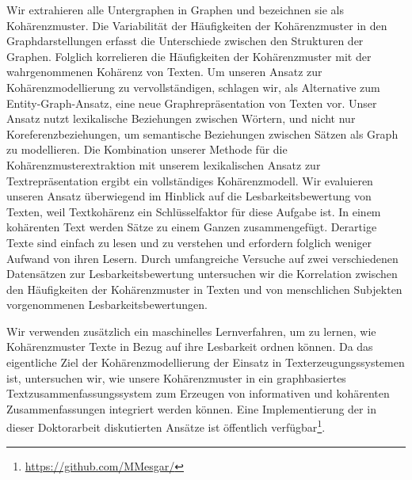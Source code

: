 Wir extrahieren alle Untergraphen in Graphen und bezeichnen sie als Kohärenzmuster. 
Die Variabilität der Häufigkeiten der Kohärenzmuster in den Graphdarstellungen erfasst die Unterschiede zwischen den Strukturen der Graphen. 
Folglich korrelieren die Häufigkeiten der Kohärenzmuster mit der wahrgenommenen Kohärenz von Texten. 
Um unseren Ansatz zur Kohärenzmodellierung zu vervollständigen, schlagen wir, als Alternative zum \mbox{Entity-Graph-Ansatz}, eine neue Graphrepräsentation von Texten vor. 
Unser Ansatz nutzt lexikalische Beziehungen zwischen Wörtern, und nicht nur Koreferenzbeziehungen, um semantische Beziehungen zwischen Sätzen als Graph zu modellieren. 
Die Kombination unserer Methode für die Kohärenzmusterextraktion mit unserem lexikalischen Ansatz zur Textrepräsentation ergibt ein vollständiges Kohärenzmodell. 
Wir evaluieren unseren Ansatz überwiegend im Hinblick auf die Lesbarkeitsbewertung von Texten, weil Textkohärenz ein Schlüsselfaktor für diese Aufgabe ist. 
In einem kohärenten Text werden Sätze zu einem Ganzen zusammengefügt. 
Derartige Texte sind einfach zu lesen und zu verstehen und erfordern folglich weniger Aufwand von ihren Lesern. 
Durch umfangreiche Versuche auf zwei verschiedenen Datensätzen zur Lesbarkeitsbewertung untersuchen wir die Korrelation zwischen den Häufigkeiten der Kohärenzmuster in Texten und von menschlichen Subjekten vorgenommenen Lesbarkeitsbewertungen. 

Wir verwenden zusätzlich ein maschinelles Lernverfahren, um zu lernen, wie Kohärenzmuster Texte in Bezug auf ihre Lesbarkeit ordnen können. 
Da das eigentliche Ziel der Kohärenzmodellierung der Einsatz in Texterzeugungssystemen ist, untersuchen wir, wie unsere Kohärenzmuster
in ein graphbasiertes Textzusammenfassungssystem zum Erzeugen von informativen und kohärenten Zusammenfassungen integriert werden können. 
Eine Implementierung der in dieser Doktorarbeit diskutierten Ansätze ist  öffentlich verfügbar\footnote{\url{https://github.com/MMesgar/}}. 
